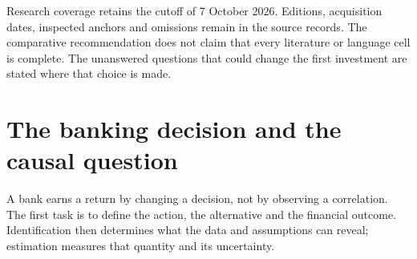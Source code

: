 Research coverage retains the cutoff of 7 October 2026. Editions, acquisition
dates, inspected anchors and omissions remain in the source records. The
comparative recommendation does not claim that every literature or language
cell is complete. The unanswered questions that could change the first
investment are stated where that choice is made.



\begingroup\setlength{\parskip}{0pt}\tableofcontents\endgroup
\mainmatter
\part{The banking decision and the causal question}
\label{reading:part-decision}
A bank earns a return by changing a decision, not by observing a correlation.
The first task is to define the action, the alternative and the financial outcome.
Identification then determines what the data and assumptions can reveal;
estimation measures that quantity and its uncertainty.


